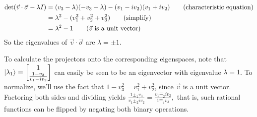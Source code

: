 \begin{align*}
    \det (\vec{v} \cdot \vec{\sigma}  - \lambda I) &= (v_3 - \lambda) (-v_3 - \lambda) - (v_1 - iv_2) (v_1 + iv_2) \tag{characteristic equation}\\
    &= \lambda^2 - (v_1^2 + v_2^2  + v_3^2) \tag{simplify}\\
    &= \lambda^2 - 1 \tag{$\vec{v}$ is a unit vector}
\end{align*}
So the eigenvalues of $\vec{v}\cdot\vec{\sigma}$ are $\lambda = \pm 1$.

To calculate the projectors onto the corresponding eigenspaces, note that $\ket{\lambda_1} = \begin{bmatrix}1 \\\frac{1-v_3}{v_1-iv_2}\end{bmatrix}$ can easily be seen to be an eigenvector with eigenvalue $\lambda=1$.  To normalize, we'll use the fact that $1-v_3^2 = v_1^2+v_2^2$, since $\vec{v}$ is a unit vector.  Factoring both sides and dividing yields $\frac{1\pm_1v_3}{v_1\pm_2iv_2} = \frac{v_1\mp_2iv_2}{1\mp_1v_3},$ that is, such rational functions can be flipped by negating both binary operations.

